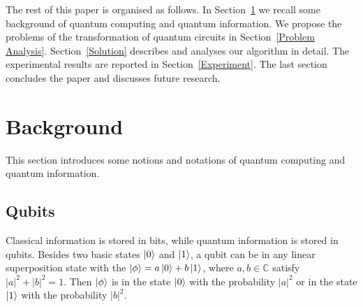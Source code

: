 \documentclass[runningheads]{llncs}
\begin{document}
The rest of this paper is organised as follows.
In Section~\ref{Background} we recall some background of quantum computing and quantum information.
We propose the problems of the transformation of quantum circuits in Section~\ref{Problem Analysis}.
Section~\ref{Solution} describes and analyses our algorithm in detail.
The experimental results are reported in Section~\ref{Experiment}. 
The last section concludes the paper and discusses future research.


\section{Background}
\label{Background}
This section introduces some notions and notations of quantum computing and quantum information.

\subsection{Qubits}
Classical information is stored in bits, while quantum information is stored in qubits. 
Besides two basic states $\left\vert{0}\right\rangle$ and $\left\vert{1}\right\rangle$,
a qubit can be in any linear superposition state with the $\left\vert{\phi}\right\rangle=a\left\vert{0}\right\rangle+b\left\vert{1}\right\rangle$,
where $a,b\in \mathbb{C}$ satisfy $|a|^{2}+|b|^{2}=1$.
Then $\left\vert{\phi}\right\rangle$ is in the state $\left\vert{0}\right\rangle$ with the probability $|a|^{2}$ or in the state $\left\vert{1}\right\rangle$ with the probability $|b|^{2}$.
\end{document}

